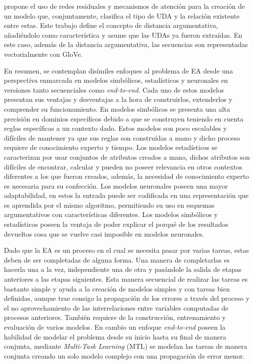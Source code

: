 \textcite{galassi2021deep} propone el uso de redes residuales y mecanismos de atención
para la creación de un modelo que, conjuntamente, clasifica el tipo de UDA y la relación existente entre estas.
Este trabajo define el concepto de distancia argumentativa, añadiéndolo como característica y asume que las UDAs ya fueron 
extraídas. En este caso, además de la distancia argumentativa, las secuencias son representadas 
vectorialmente con GloVe.

En resumen, se contemplan disímiles enfoques al problema de EA desde una perspectiva enmarcada en modelos 
simbólicos, estadísticos y neuronales en versiones tanto secuenciales como \emph{end-to-end}. 
Cada uno de estos modelos presentan sus ventajas y desventajas a la hora de construirlos, 
extenderlos y comprender su funcionamiento. En modelos simbólicos se presenta una alta
precisión en dominios específicos debido a que se construyen teniendo en cuenta reglas específicas a un
contexto dado. Estos modelos son poco escalables y difíciles de mantener ya que sus reglas son construídas
a mano y dicho proceso requiere de conocimiento experto y tiempo. Los modelos estadísticos 
se caracterizan por usar conjuntos de atributos creados a mano, dichos atributos son difíciles
de encontrar, calcular y pueden no poseer relevancia en otros contextos diferentes a los que fueron creados,
además, la necesidad de conocimiento experto es necesaria para su confección. Los modelos neuronales poseen
una mayor adaptabilidad, en estos la entrada puede ser codificada en una representación que es aprendida por
el mismo algoritmo, permitiendo su uso en esquemas argumentativos con características diferentes. Los modelos simbólicos y 
estadísticos poseen la ventaja de poder explicar el porqué de los resultados devueltos cosa que se vuelve casi
imposible en modelos neuronales.

Dado que la EA es un proceso en el cual se necesita pasar por varias tareas, estas deben de ser completadas
de alguna forma. Una manera de completarlas es hacerla una a la vez, independiente una de otra y pasándole
la salida de etapas anteriores a las etapas siguientes. Esta manera secuencial de realizar las 
tareas es bastante simple y ayuda a la creación de modelos simples y con tareas bien definidas, aunque trae consigo 
la propagación de los errores a través del proceso y el no aprovechamiento de las interrelaciones entre variables 
computadas de procesos anteriores. También requiere de la construcción, entrenamiento y evaluación de varios modelos.
En cambio un enfoque \emph{end-to-end} poseen la habilidad de modelar el problema 
desde su inicio hasta su final de manera conjunta, mediante \emph{Multi-Task Learning} (MTL) se modelan
las tareas de manera conjunta creando un solo modelo complejo con una propagación de error menor.


